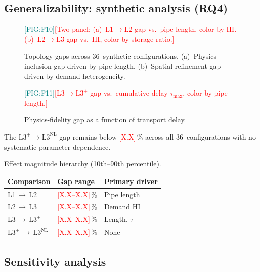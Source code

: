 \documentclass[review,3p]{elsarticle}
\newcommand{\placeholder}[1]{\textcolor{red}{[#1]}}
\newcommand{\Lplus}{\mathrm{L3}^{+}}
\newcommand{\Lnl}{\mathrm{L3}^{\mathrm{NL}}}
\newcommand{\figref}[1]{\textcolor{teal}{[FIG:#1]}}
\begin{document}
\subsection{Generalizability: synthetic analysis (RQ4)}
\label{sec:results_generalizability}

\begin{figure}[!htbp]
  \centering
  \figref{F10}\quad\placeholder{Two-panel: (a)~L1$\to$L2 gap vs.\
  pipe length, color by HI. (b)~L2$\to$L3 gap vs.\ HI, color by
  storage ratio.}
  \caption{Topology gaps across 36~synthetic configurations.
  (a)~Physics-inclusion gap driven by pipe length.
  (b)~Spatial-refinement gap driven by demand heterogeneity.}
  \label{fig:synth_topology_gaps}
\end{figure}

\begin{figure}[htbp]
  \centering
  \figref{F11}\quad\placeholder{L3$\to\Lplus$ gap vs.\ cumulative
  delay $\tau_{\max}$, color by pipe length.}
  \caption{Physics-fidelity gap as a function of transport delay.}
  \label{fig:synth_l3lp_gap}
\end{figure}

The $\Lplus \to \Lnl$ gap remains below \placeholder{X.X}\,\% across
all 36~configurations with no systematic parameter dependence.

\begin{table}[htbp]
\centering
\caption{Effect magnitude hierarchy (10th--90th percentile).}
\label{tab:effect_hierarchy}
\begin{tabular}{@{} l l l @{}}
\toprule
Comparison & Gap range & Primary driver \\
\midrule
L1\,$\to$\,L2        & \placeholder{X.X--X.X}\,\% & Pipe length \\
L2\,$\to$\,L3        & \placeholder{X.X--X.X}\,\% & Demand HI \\
L3\,$\to$\,$\Lplus$  & \placeholder{X.X--X.X}\,\% & Length, $\tau$ \\
$\Lplus$\,$\to$\,$\Lnl$ & \placeholder{X.X--X.X}\,\% & None \\
\bottomrule
\end{tabular}
\end{table}

\subsection{Sensitivity analysis}
\label{sec:results_sensitivity}
\end{document}
